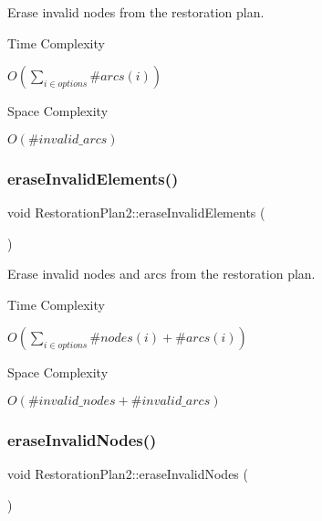 Erase invalid nodes from the restoration plan. 

\begin{DoxyRefDesc}{Time Complexity}
\item[\hyperlink{time__time000031}{Time Complexity}]$O(\sum_{i \in options} \#arcs(i))$ \end{DoxyRefDesc}
\begin{DoxyRefDesc}{Space Complexity}
\item[\hyperlink{space__space000031}{Space Complexity}]$O(\#invalid\_arcs)$ \end{DoxyRefDesc}
\mbox{\label{class_restoration_plan2_aeb925e92d2141fe96979538f087c277a}} 
\subsubsection{\texorpdfstring{erase\+Invalid\+Elements()}{eraseInvalidElements()}}
{\footnotesize\ttfamily void Restoration\+Plan2\+::erase\+Invalid\+Elements (\begin{DoxyParamCaption}{ }\end{DoxyParamCaption})\hspace{0.3cm}{\ttfamily [inline]}}



Erase invalid nodes and arcs from the restoration plan. 

\begin{DoxyRefDesc}{Time Complexity}
\item[\hyperlink{time__time000032}{Time Complexity}]$O(\sum_{i \in options} \#nodes(i) + \#arcs(i))$ \end{DoxyRefDesc}
\begin{DoxyRefDesc}{Space Complexity}
\item[\hyperlink{space__space000032}{Space Complexity}]$O(\#invalid\_nodes + \#invalid\_arcs)$ \end{DoxyRefDesc}
\mbox{\label{class_restoration_plan2_a5258c8409176279c8bab604400722b25}} 
\subsubsection{\texorpdfstring{erase\+Invalid\+Nodes()}{eraseInvalidNodes()}}
{\footnotesize\ttfamily void Restoration\+Plan2\+::erase\+Invalid\+Nodes (\begin{DoxyParamCaption}{ }\end{DoxyParamCaption})\hspace{0.3cm}{\ttfamily [inline]}}



